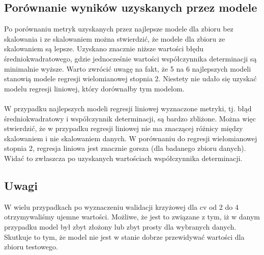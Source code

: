 \documentclass[11pt, a4paper, notitlepage]{report}
\begin{document}
\subsection{Porównanie wyników uzyskanych przez modele}
Po porównaniu metryk uzyskanych przez najlepsze modele dla zbioru bez skalowania i ze skalowaniem można stwierdzić, że modele dla zbioru ze skalowaniem są lepsze.
Uzyskano znacznie niższe wartości błędu średniokwadratowego, gdzie jednocześnie wartości współczynnika determinacji są minimalnie wyższe.
Warto zwrócić uwagę na fakt, że 5 na 6 najlepszych modeli stanowią modele regresji wielomianowej stopnia 2. Niestety nie udało się uzyskać modelu regresji liniowej, który dorównałby tym modelom.
\\ \\
W przypadku najlepszych modeli regresji liniowej wyznaczone metryki, tj. błąd średniokwadratowy i współczynnik determinacji, są bardzo zbliżone.
Można więc stwierdzić, że w przypadku regresji liniowej nie ma znaczącej różnicy między skalowaniem i nie skalowaniem danych.
W porównaniu do regresji wielomianowej stopnia 2, regresja liniowa jest znacznie gorsza (dla badanego zbioru danych). Widać to zwłaszcza po uzyskanych wartościach współczynnika determinacji.
\subsection{Uwagi}
W wielu przypadkach po wyznaczeniu walidacji krzyżowej dla cv od 2 do 4 otrzymywaliśmy ujemne wartości. Możliwe, że jest to związane z tym, iż w danym przypadku model był zbyt złożony lub zbyt prosty dla wybranych danych.
Skutkuje to tym, że model nie jest w stanie dobrze przewidywać wartości dla zbioru testowego.
\end{document}
